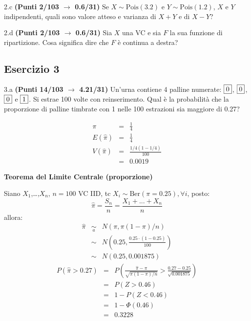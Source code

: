 \documentclass[
  11pt,
]{book}
\theoremstyle{mytheoremstyle}
\theoremstyle{mydefstyle}
\newenvironment{sol}
  {
  \begin{tcolorbox}[enhanced,breakable,arc=0.1mm,boxrule=1pt,colback=white,colframe=iblue,
  title=\bf \fontfamily{lmss}\selectfont \hspace{.5 cm} Soluzione,drop fuzzy shadow]

}{
\end{tcolorbox}
  }
\begin{document}
2.c \textbf{(Punti 2/103 \(\rightarrow\) 0.6/31)} Se \(X\sim\text{Pois}(3.2)\) e \(Y\sim\text{Pois}(1.2)\), \(X\) e \(Y\) indipendenti, quali sono valore atteso e varianza di \(X+Y\) e di \(X-Y\)?

2.d \textbf{(Punti 2/103 \(\rightarrow\) 0.6/31)} Sia \(X\) una VC e sia \(F\) la sua funzione di ripartizione. Cosa significa dire che \(F\) è continua a destra?

\subsection{Esercizio 3}\label{esercizio-3-18}

3.a \textbf{(Punti 14/103 \(\rightarrow\) 4.21/31)} Un'urna contiene 4 palline numerate: \(\fbox{0}\), \(\fbox{0}\), \(\fbox{0}\) e \(\fbox{1}\). Si estrae 100 volte con reinserimento. Qual è la probabilità che la proporzione di palline timbrate con 1 nelle 100 estrazioni sia maggiore di 0.27?

\begin{sol}
\begin{eqnarray*}
  \pi &=&  \frac 14\\
  E(\hat\pi) &=& \frac 14\\
  V(\hat\pi) &=& \frac {1/4(1-1/4)}{100}\\
  &=& 0.0019
\end{eqnarray*}

\textbf{Teorema del Limite Centrale (proporzione)}

Siano \(X_1\),\ldots,\(X_n\), \(n=100\) VC IID, tc \(X_i\sim\text{Ber}(\pi=0.25)\)\(,\forall i\), posto:
\[
      \hat\pi=\frac{S_n}n = \frac{X_1 + ... + X_n}n
      \]
allora:\begin{eqnarray*}
  \hat\pi & \mathop{\sim}\limits_{a}& N(\pi,\pi(1-\pi)/n) \\
  &\sim & N\left(0.25,\frac{0.25\cdot(1-0.25)}{100}\right) \\
     &\sim & N(0.25,0.001875) 
  \end{eqnarray*}\begin{eqnarray*}
      P( \hat\pi   >   0.27 ) 
        &=& P\left(  \frac { \hat\pi  -  \pi }{ \sqrt{\pi(1-\pi)/n} }  >  \frac { 0.27  -  0.25 }{\sqrt{ 0.001875 }} \right)  \\
                 &=& P\left(  Z   >   0.46 \right) \\    &=& 1-P(Z< 0.46 )\\ 
                 &=&  1-\Phi( 0.46 ) \\ &=&  0.3228 
      \end{eqnarray*}

\end{sol}
\end{document}
